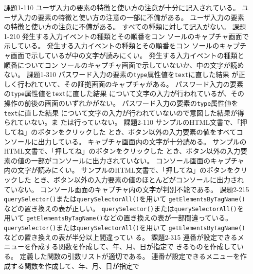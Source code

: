 \documentclass[a4j]{jreport}
\begin{document}
{
{課題1-1}{10}
{
  {ユーザ入力の要素の特徴と使い方の注意が十分に記入されている。\ResultEI}
}
{
  {ユーザ入力の要素の特徴と使い方の注意の一部に不備がある。\ResultEI}
}
{
  {ユーザ入力の要素の特徴と使い方の注意に不備がある。\ResultEI}
  {すべての種類に対して記入がない。\ResultEI}
}
{課題1-2}{10}
{
  {発生する入力イベントの種類とその順番をコン
  ソールのキャプチャ画面で示している。\ResultA}
}
{
  {発生する入力イベントの種類とその順番をコン
  ソールのキャプチャ画面で示しているが中の文字が読みにくい。\ResultA}
}
{
  {発生する入力イベントの種類と順番についてコン
  ソールのキャプチャ画面で示していないか、中の文字が読めない。\ResultA}
  }
{課題1-3}{10}
{
  {パスワード入力の要素の\texttt{type}属性値を\texttt{text}に直した結果
  が正しく行われていて、その証拠画面のキャプチャがある。\ResultFI}
}
{
  {パスワード入力の要素の\texttt{type}属性値を\texttt{text}に直した結果
  について文字の入力が行われているが、その操作の前後の画面のいずれかがない。\ResultFI}
}
{
  {パスワード入力の要素の\texttt{type}属性値を\texttt{text}に直した結果
  について文字の入力が行われていないので意図した結果が得られていない。ま
  たは行っていない。\ResultFI}
  }
 {課題2-1}{10}
 {
   {サンプルのHTML文書で、「押してね」のボタンをクリックした
   とき、ボタン以外の入力要素の値をすべてコンソールに出力している。\ResultA}
   {キャプチャ画面内の文字が十分読める。\ResultF}
 }
 {
  {サンプルのHTML文書で、「押してね」のボタンをクリックした
  とき、ボタン以外の入力要素の値の一部がコンソールに出力されていない。\ResultA}
  {コンソール画面のキャプチャ内の文字が読みにくい。\ResultF}
 }
 {
  {サンプルのHTML文書で、「押してね」のボタンをクリックした
 とき、ボタン以外の入力要素の値のほとんどがコンソールに出力されていない。
 \ResultA}
 {コンソール画面のキャプチャ内の文字が判別不能である。\ResultF}
 }
 {課題2-2}{15}
 {
   {\texttt{querySelector()}または\texttt{querySelectorAll()}を用いて\newline
   \texttt{getElementsByTagName()}などの置き換えの表が正しい。\ResultEI}
 }
 {
   {\texttt{querySelector()}または\texttt{querySelectorAll()}を用いて\newline
   \texttt{getElementsByTagName()}などの置き換えの表が一部間違っている。\ResultEI}
 }
 {
   {\texttt{querySelector()}または\texttt{querySelectorAll()}を用いて\newline
   \texttt{getElementsByTagName()}などの置き換えの表が半分以上間違ってい
   る。\ResultEI}
 }
 {課題2-3}{15}
 {
   {連番が設定できるメニューを作成する関数を作成して、年、月、日が指定で
   きるものを作成している。\ResultA}
   {定義した関数の引数リストが適切である。\ResultA}
 }
 {
   {連番が設定できるメニューを作成する関数を作成して、年、月、日が指定で
}}}
\end{document}

